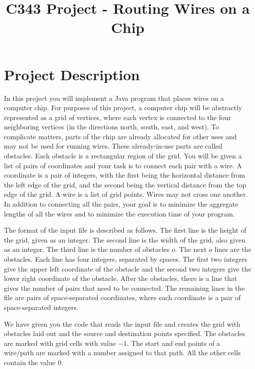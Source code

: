 \documentclass[12pt]{article}
\title{C343 Project - Routing Wires on a Chip}
\date{}
\begin{document}
\maketitle

\section{Project Description}

In this project you will implement a Java program that places wires
on a computer chip. For purposes of this project, a computer chip will
be abstractly represented as a grid of vertices, where each vertex is
connected to the four neighboring vertices (in the directions north,
south, east, and west). To complicate matters, parts of the chip are
already allocated for other uses and may not be used for running
wires. These already-in-use parts are called obstacles. Each obstacle
is a rectangular region of the grid. You will be given a list of pairs
of coordinates and your task is to connect each pair with a wire.  A
coordinate is a pair of integers, with the first being the horizontal
distance from the left edge of the grid, and the second being the
vertical distance from the top edge of the grid.  A wire is a list of
grid points. Wires may not cross one another.  In addition to
connecting all the pairs, your goal is to minimize the aggregate
lengths of all the wires and to minimize the execution time of your
program.

The format of the input file is described as follows.  The first line
is the height of the grid, given as an integer.  The second line is
the width of the grid, also given as an integer.  The third line is
the number of obstacles $o$.  The next $o$ lines are the obstacles.
Each line has four integers, separated by spaces. The first two
integers give the upper left coordinate of the obstacle and the second
two integers give the lower right coordinate of the obstacle.  After
the obstacles, there is a line that gives the number of pairs that
need to be connected. The remaining lines in the file are pairs of
space-separated coordinates, where each coordinate is a pair of
space-separated integers.

We have given you the code that reads the input file and creates the grid
with obstacles laid out and the source and destination points specified.
The obstacles are marked with grid cells with value $-1$. The start
and end points of a wire/path are marked with a number assigned to
that path. All the other cells contain the value $0$.
\end{document}
